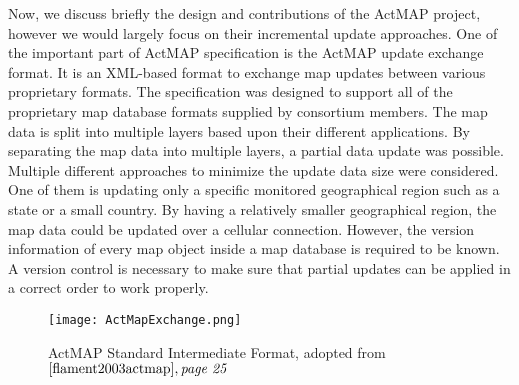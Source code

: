 Now, we discuss briefly the design and contributions of the ActMAP project, however we would largely focus on their incremental update approaches. One of the important part of ActMAP specification is the ActMAP update exchange format. It is an XML-based format to exchange map updates between various proprietary formats. The specification was designed to support all of the proprietary map database formats supplied by consortium members. The map data is split into multiple layers based upon their different applications. By separating the map data into multiple layers, a partial data update was possible. Multiple different approaches to minimize the update data size were considered. One of them is updating only a specific monitored geographical region such as a state or a small country. By having a relatively smaller geographical region, the map data could be updated over a cellular connection. However, the version information of every map object inside a map database is required to be known. A version control is necessary to make sure that partial updates can be applied in a correct order to work properly. \\

\begin{figure}
\centering
\texttt{[image: ActMapExchange.png]}
\caption{ActMAP Standard Intermediate Format, adopted from $\cite{flament2003actmap}, \textit{page 25}$}
\label{fg:actmap}
\end{figure}

